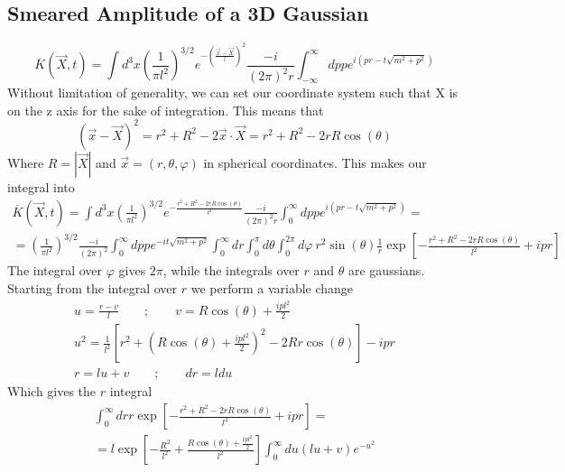 \documentclass{article}
\begin{document}
\subsection{Smeared Amplitude of a 3D Gaussian}
\begin{equation}
    \overline{K}\left(\vec{X}, t\right) = \int d^3x \left(\frac{1}{\pi l^2}\right)^{3/2}e^{-\left(\frac{\vec{x} - \vec{X}}{l}\right)^2} \frac{-i}{\left(2\pi\right)^2 r}
    \int_{-\infty}^{\infty} dp p e^{i\left(pr - t\sqrt{m^2 + p^2}\right)}
\end{equation}
Without limitation of generality, we can set our coordinate system such that X is on the z axis for the sake of integration. This means that
\begin{equation}
    \left(\vec{x} - \vec{X}\right)^2 = r^2 + R^2 - 2\vec{x}\cdot\vec{X} = r^2 + R^2 - 2rR \cos(\theta)
\end{equation}
Where $R = |\vec{X}|$ and $\vec{x} = (r, \theta, \varphi)$ in spherical coordinates. This makes our integral into
\begin{equation}
\begin{gathered}
    \overline{K}\left(\vec{X}, t\right) = \int d^3x \left(\frac{1}{\pi l^2}\right)^{3/2}e^{-\frac{r^2 + R^2 - 2rR\cos(\theta)}{l^2}} \frac{-i}{\left(2\pi\right)^2 r}
    \int_{0}^{\infty} dp p e^{i\left(pr - t\sqrt{m^2 + p^2}\right)} = \\
    = \left(\frac{1}{\pi l^2}\right)^{3/2} \frac{-i}{\left(2\pi\right)^2}
    \int_{0}^{\infty} dp p e^{-it\sqrt{m^2 + p^2}}
    \int_0^{\infty} dr \int_0^{\pi} d\theta \int_0^{2\pi} d\varphi
    \ r^2 \sin(\theta)
    \frac{1}{r}
    \exp[-\frac{r^2 + R^2 - 2rR\cos(\theta)}{l^2} + ipr]
\end{gathered}
\end{equation}
The integral over $\varphi$ gives $2\pi$, while the integrals over $r$ and $\theta$ are gaussians. Starting from the integral over $r$ we perform a variable change
\begin{equation}
\begin{gathered}
    u = \frac{r - v}{l} \qquad ; \qquad v = R\cos(\theta) + \frac{ipl^2}{2} \\
    u^2 = \frac{1}{l^2}\left[
        r^2 + \left(R\cos(\theta) + \frac{ipl^2}{2}\right)^2 - 2Rr\cos(\theta)
    \right] - ipr \\
    r = lu + v \qquad ; \qquad dr = ldu
\end{gathered}
\end{equation}
Which gives the $r$ integral
\begin{equation}
\begin{gathered}
    \int_0^\infty dr r \exp[-\frac{r^2 + R^2 - 2rR\cos(\theta)}{l^2} + ipr] = \\
    = l \exp[-\frac{R^2}{l^2} + \frac{R\cos(\theta) + \frac{ipl^2}{2}}{l^2}] \int_0^\infty du (lu + v) e^{-u^2}
\end{gathered}
\end{equation}
\end{document}
